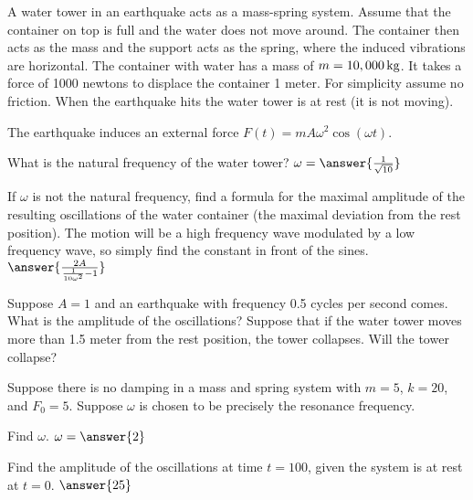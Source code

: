 \documentclass{ximera}
\begin{document}
\begin{exercise}
    A water tower in an earthquake acts as a mass-spring system. Assume that the container on top is full and the water does not move around. The container then acts as the mass and the support acts as the spring, where the induced vibrations are horizontal.  The container with water has a mass of $m=\unit[10,000]{kg}$.  It takes a force of 1000 newtons to displace the container 1 meter.  For simplicity assume no friction. When the earthquake hits the water tower is at rest (it is not moving). 
    
    The earthquake induces an external force $F(t) = m A \omega^2 \cos (\omega t)$.
    
    What is the natural frequency of the water tower? $\omega = \answer{\frac{1}{\sqrt{10}}}$
    \begin{problem}
        If $\omega$ is not the natural frequency, find a formula for the maximal amplitude of the resulting oscillations of the water container (the maximal deviation from the rest position).  The motion will be a high frequency wave modulated by a low frequency wave, so simply find the constant in front of the sines. $\answer{\frac{2A}{\frac{1}{10\omega^2} - 1}}$
        \begin{problem}
            Suppose $A = 1$ and an earthquake with frequency 0.5 cycles per second comes.  What is the amplitude of the oscillations?  Suppose that if the water tower moves more than 1.5 meter from the rest position, the tower collapses. Will the tower collapse? 
            \begin{multipleChoice}
            \end{multipleChoice}
        \end{problem}
    \end{problem}
\end{exercise}

\begin{exercise}%
    Suppose there is no damping in a mass and spring system with $m = 5$, $k= 20$, and $F_0 = 5$.  Suppose $\omega$ is chosen to be precisely the resonance frequency.
    
    Find $\omega$. $\omega = \answer{2}$
    \begin{problem}
        Find the amplitude of the oscillations at time $t=100$, given the system is at rest at $t=0$. $\answer{25}$
    \end{problem}
\end{exercise}
\end{document}
